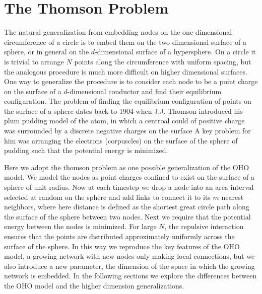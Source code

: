 \documentclass[aps,pre,reprint,superscriptaddress,amsmath,amssymb,nofootinbib]{revtex4-1}
\begin{document}
\section{The Thomson Problem}
The natural generalization from embedding nodes on the one-dimensional circumference of a circle is to embed them on the two-dimensional surface of a sphere, or in general on the $d$-dimensional surface of a hypersphere.
On a circle it is trivial to arrange $N$ points along the circumference with uniform spacing, but the analogous procedure is much more difficult on higher dimensional surfaces.
One way to generalize the procedure is to consider each node to be a point charge on the surface of a $d$-dimensional conductor and find their equilibrium configuration. 
The problem of finding the equilibrium configuration of points on the surface of a sphere dates back to 1904 when J.J. Thomson introduced his plum pudding model of the atom, in which a centroal could of positive charge was surrounded by a discrete negative charges on the surface \cite{thomson1904}
A key problem for him was arranging the electrons (corpuscles) on the surface of the sphere of pudding such that the potential energy is minimized.

Here we adopt the thomson problem as one possible generalization of the OHO model.
We model the nodes as point charges confined to exist on the surface of a sphere of unit radius.
Now at each timestep we drop a node into an area interval selected at random on the sphere and add links to connect it to its $m$ nearest neighbors, where here distance is defined as the shortest great circle path along the surface of the sphere between two nodes.
Next we require that the potential energy between the nodes is minimized.
For large $N$, the repulsive interaction ensures that the points are distributed approximately uniformly across the surface of the sphere.
In this way we reproduce the key features of the OHO model, a growing network with new nodes only making local connections, but we also introduce a new parameter, the dimension of the space in which the growing network is embedded.
In the following sections we explore the differences between the OHO model and the higher dimension generalizations.

\end{document}
